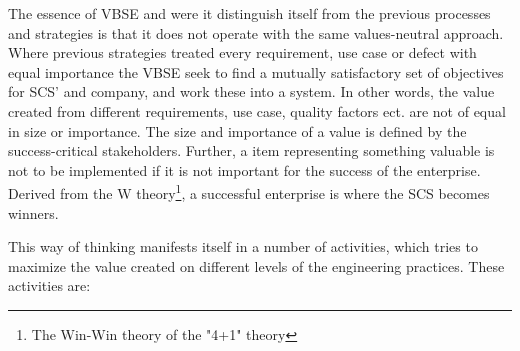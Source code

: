 \documentclass{sig-alternate}
\begin{document}
The essence of VBSE and were it distinguish itself from the previous processes and strategies is that it does not operate with the same values-neutral approach. Where previous strategies treated every requirement, use case or defect with equal importance the VBSE seek to find a mutually satisfactory set of objectives for SCS' and company, and work these into a system. In other words, the value created from different requirements, use case, quality factors ect. are not of equal in size or importance. The size and importance of a value is defined by the success-critical stakeholders. Further, a item representing something valuable is not to be implemented if it is not important for the success of the enterprise. Derived from the W theory\footnote{The Win-Win theory of the "4+1" theory}, a successful enterprise is where the SCS becomes winners. 

This way of thinking manifests itself in a number of activities, which tries to maximize the value created on different levels of the engineering practices. These activities are:
\end{document}
